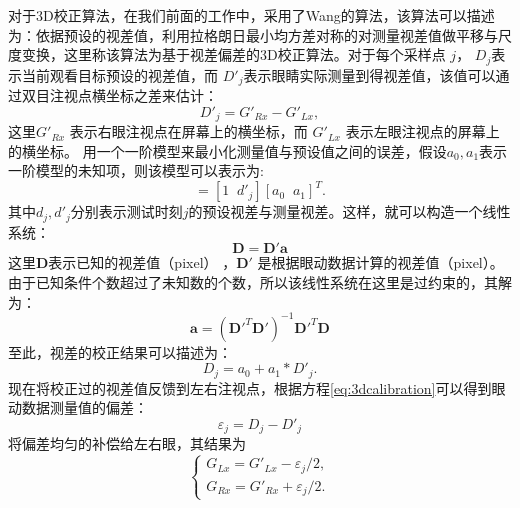 对于3D校正算法，在我们前面的工作中\parencite{ma2015new}，采用了Wang\parencite{wang2014online}的算法，该算法可以描述为：依据预设的视差值，利用拉格朗日最小均方差\parencite{lancaster1986curve}对称的对测量视差值做平移与尺度变换，这里称该算法为基于视差偏差的3D校正算法。对于每个采样点 $j$， ${D_j}$表示当前观看目标预设的视差值，而 ${D'_j}$表示眼睛实际测量到得视差值，该值可以通过双目注视点横坐标之差来估计：
\begin{equation}
\label{eq:disparitypixel}
{D'_j} = {G'_{Rx}} - {G'_{Lx}},
\end{equation}
这里$G'_{Rx}$ 表示右眼注视点在屏幕上的横坐标，而 $G'_{Lx}$ 表示左眼注视点的屏幕上的横坐标。 用一个一阶模型来最小化测量值与预设值之间的误差，假设${a_0}, {a_1}$表示一阶模型的未知项，则该模型可以表示为:
\begin{equation}
[{d_j}] = [1\;\;{d'_j}]{\left[ {{a_0}\;\;{a_1}} \right]^T}.
\end{equation}
其中${d_j},{d'_j}$分别表示测试时刻$j$的预设视差与测量视差。这样，就可以构造一个线性系统：
\begin{equation}
\textbf{D} = \textbf{D}'\textbf{a}
\end{equation}
这里$\textbf{D}$表示已知的视差值（pixel） ，$\textbf{D}'$ 是根据眼动数据计算的视差值（pixel）。由于已知条件个数超过了未知数的个数，所以该线性系统在这里是过约束的，其解为：
\begin{equation}
\textbf{a} = {({\textbf{D}'^T}\textbf{D}')^{-1}}{\textbf{D}'^T}\textbf{D}
\end{equation}
至此，视差的校正结果可以描述为：
\begin{equation}
\label{eq:3dcalibration}
{D_j} = {a_0} + {a_1}*{D'_j}.
\end{equation}
现在将校正过的视差值反馈到左右注视点，根据方程\ref{eq:3dcalibration}可以得到眼动数据测量值的偏差：
\begin{equation}
\label{eq:errorcal}
{\varepsilon_j} = {D_j} - {D'_j}
\end{equation}
将偏差均匀的补偿给左右眼，其结果为
\begin{equation}
\label{eq:servertoeye}
\left\{ \begin{array}{l}
{G_{Lx}} = {{G'}_{Lx}} - \varepsilon_j /2,\\
{G_{Rx}} = {{G'}_{Rx}} + \varepsilon_j /2.
\end{array} \right.
\end{equation}

